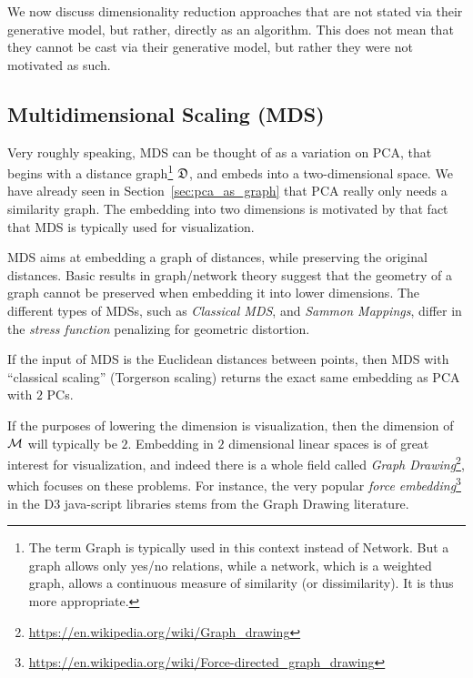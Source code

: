 \documentclass[12pt,a4paper]{article}
\begin{document}
We now discuss dimensionality reduction approaches that are not stated via their generative model, but rather, directly as an algorithm.
This does not mean that they cannot be cast via their generative model, but rather they were not motivated as such.



\subsection{Multidimensional Scaling (MDS)}
\label{sec:mds}

Very roughly speaking, MDS can be thought of as a variation on PCA, that begins with a distance graph\footnote{The term Graph is typically used in this context instead of Network. But a graph allows only yes/no relations, while a network, which is a weighted graph, allows a continuous measure of similarity (or dissimilarity). It is thus more appropriate.} $\mathfrak{D}$, and embeds into a two-dimensional space.
We have already seen in Section~\ref{sec:pca_as_graph} that PCA really only needs a similarity graph. 
The embedding into two dimensions is motivated by that fact that MDS is typically used for visualization. 

MDS aims at embedding a graph of distances, while preserving the original distances.
Basic results in graph/network theory suggest that the geometry of a graph cannot be preserved when embedding it into lower dimensions. 
The different types of MDSs, such as \emph{Classical MDS}, and \emph{Sammon Mappings}, differ in the \emph{stress function} penalizing for geometric distortion.

\begin{remark}
	If the input of MDS is the Euclidean distances between points, then MDS with ``classical scaling'' (\aka Torgerson scaling) returns the exact same embedding as PCA with $2$ PCs.
\end{remark}


\begin{remark}
	If the purposes of lowering the dimension is visualization, then the dimension of $\mathcal{M}$ will typically be $2$. 
	Embedding in $2$ dimensional linear spaces is of great interest for visualization, and indeed there is a whole field called \emph{Graph Drawing}\footnote{\url{https://en.wikipedia.org/wiki/Graph_drawing}}, which focuses on these problems.
	For instance, the very popular \emph{force embedding}\footnote{\url{https://en.wikipedia.org/wiki/Force-directed_graph_drawing}} in the D3 java-script libraries stems from the Graph Drawing literature. 
\end{remark}
\end{document}
